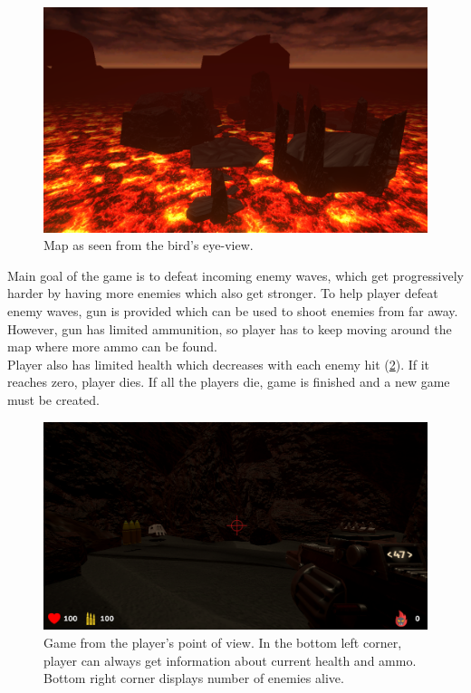 \documentclass[times, utf8, diplomski]{fer}
\begin{document}
\begin{figure}[H]
	\centering
	\includegraphics[scale=0.56]{Game-map}
	\caption{Map as seen from the bird's eye-view.}
	\label{fig:game-map}
\end{figure}

Main goal of the game is to defeat incoming enemy waves, which get progressively harder by having more enemies which also get stronger. To help player defeat enemy waves, gun is provided which can be used to shoot enemies from far away. However, gun has limited ammunition, so player has to keep moving around the map where more ammo can be found. \\

Player also has limited health which decreases with each enemy hit (\ref{fig:game-spawn}). If it reaches zero, player dies. If all the players die, game is finished and a new game must be created.

\begin{figure}[H]
	\centering
	\includegraphics[scale=0.5]{Game-spawn}
	\caption{Game from the player's point of view. In the bottom left corner, player can always get information about current health and ammo. Bottom right corner displays number of enemies alive.}
	\label{fig:game-spawn}
\end{figure}
\end{document}
